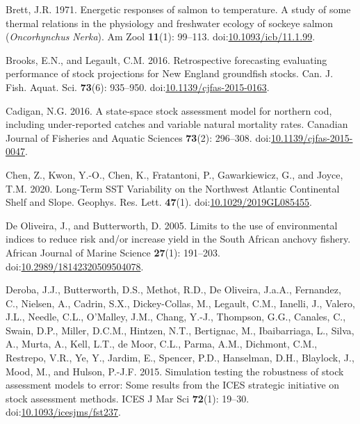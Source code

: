 \documentclass[]{article}
\begin{document}
\leavevmode\hypertarget{ref-brett1971Energetic}{}%
Brett, J.R. 1971. Energetic responses of salmon to temperature. A study
of some thermal relations in the physiology and freshwater ecology of
sockeye salmon (\emph{Oncorhynchus} \emph{Nerka}). Am Zool
\textbf{11}(1): 99--113.
doi:\href{https://doi.org/10.1093/icb/11.1.99}{10.1093/icb/11.1.99}.

\leavevmode\hypertarget{ref-brooks2016Retrospective}{}%
Brooks, E.N., and Legault, C.M. 2016. Retrospective forecasting
evaluating performance of stock projections for New England groundfish
stocks. Can. J. Fish. Aquat. Sci. \textbf{73}(6): 935--950.
doi:\href{https://doi.org/10.1139/cjfas-2015-0163}{10.1139/cjfas-2015-0163}.

\leavevmode\hypertarget{ref-cadigan2016Statespace}{}%
Cadigan, N.G. 2016. A state-space stock assessment model for northern
cod, including under-reported catches and variable natural mortality
rates. Canadian Journal of Fisheries and Aquatic Sciences
\textbf{73}(2): 296--308.
doi:\href{https://doi.org/10.1139/cjfas-2015-0047}{10.1139/cjfas-2015-0047}.

\leavevmode\hypertarget{ref-chen2020Long}{}%
Chen, Z., Kwon, Y.-O., Chen, K., Fratantoni, P., Gawarkiewicz, G., and
Joyce, T.M. 2020. Long-Term SST Variability on the Northwest Atlantic
Continental Shelf and Slope. Geophys. Res. Lett. \textbf{47}(1).
doi:\href{https://doi.org/10.1029/2019GL085455}{10.1029/2019GL085455}.

\leavevmode\hypertarget{ref-deoliveira2005Limits}{}%
De Oliveira, J., and Butterworth, D. 2005. Limits to the use of
environmental indices to reduce risk and/or increase yield in the South
African anchovy fishery. African Journal of Marine Science
\textbf{27}(1): 191--203.
doi:\href{https://doi.org/10.2989/18142320509504078}{10.2989/18142320509504078}.

\leavevmode\hypertarget{ref-deroba2015Simulation}{}%
Deroba, J.J., Butterworth, D.S., Methot, R.D., De Oliveira, J.a.A.,
Fernandez, C., Nielsen, A., Cadrin, S.X., Dickey-Collas, M., Legault,
C.M., Ianelli, J., Valero, J.L., Needle, C.L., O'Malley, J.M., Chang,
Y.-J., Thompson, G.G., Canales, C., Swain, D.P., Miller, D.C.M.,
Hintzen, N.T., Bertignac, M., Ibaibarriaga, L., Silva, A., Murta, A.,
Kell, L.T., de Moor, C.L., Parma, A.M., Dichmont, C.M., Restrepo, V.R.,
Ye, Y., Jardim, E., Spencer, P.D., Hanselman, D.H., Blaylock, J., Mood,
M., and Hulson, P.-J.F. 2015. Simulation testing the robustness of stock
assessment models to error: Some results from the ICES strategic
initiative on stock assessment methods. ICES J Mar Sci \textbf{72}(1):
19--30.
doi:\href{https://doi.org/10.1093/icesjms/fst237}{10.1093/icesjms/fst237}.
\end{document}
